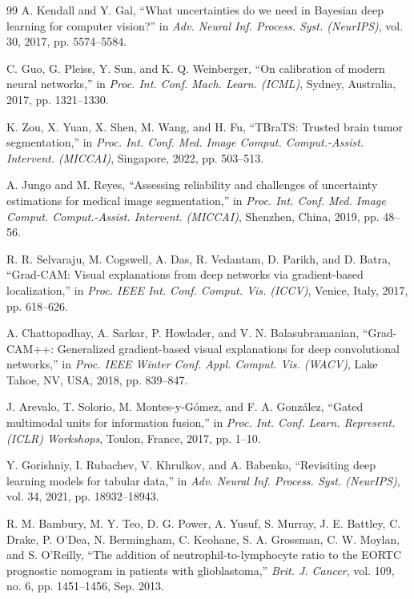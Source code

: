 \documentclass[conference]{IEEEtran}
\begin{document}
\begin{thebibliography}{99}
A. Kendall and Y. Gal, ``What uncertainties do we need in Bayesian deep learning for computer vision?'' in \textit{Adv. Neural Inf. Process. Syst. (NeurIPS)}, vol. 30, 2017, pp. 5574--5584.

C. Guo, G. Pleiss, Y. Sun, and K. Q. Weinberger, ``On calibration of modern neural networks,'' in \textit{Proc. Int. Conf. Mach. Learn. (ICML)}, Sydney, Australia, 2017, pp. 1321--1330.

K. Zou, X. Yuan, X. Shen, M. Wang, and H. Fu, ``TBraTS: Trusted brain tumor segmentation,'' in \textit{Proc. Int. Conf. Med. Image Comput. Comput.-Assist. Intervent. (MICCAI)}, Singapore, 2022, pp. 503--513.

A. Jungo and M. Reyes, ``Assessing reliability and challenges of uncertainty estimations for medical image segmentation,'' in \textit{Proc. Int. Conf. Med. Image Comput. Comput.-Assist. Intervent. (MICCAI)}, Shenzhen, China, 2019, pp. 48--56.

R. R. Selvaraju, M. Cogswell, A. Das, R. Vedantam, D. Parikh, and D. Batra, ``Grad-CAM: Visual explanations from deep networks via gradient-based localization,'' in \textit{Proc. IEEE Int. Conf. Comput. Vis. (ICCV)}, Venice, Italy, 2017, pp. 618--626.

A. Chattopadhay, A. Sarkar, P. Howlader, and V. N. Balasubramanian, ``Grad-CAM++: Generalized gradient-based visual explanations for deep convolutional networks,'' in \textit{Proc. IEEE Winter Conf. Appl. Comput. Vis. (WACV)}, Lake Tahoe, NV, USA, 2018, pp. 839--847.

J. Arevalo, T. Solorio, M. Montes-y-G\'{o}mez, and F. A. Gonz\'{a}lez, ``Gated multimodal units for information fusion,'' in \textit{Proc. Int. Conf. Learn. Represent. (ICLR) Workshops}, Toulon, France, 2017, pp. 1--10.

Y. Gorishniy, I. Rubachev, V. Khrulkov, and A. Babenko, ``Revisiting deep learning models for tabular data,'' in \textit{Adv. Neural Inf. Process. Syst. (NeurIPS)}, vol. 34, 2021, pp. 18932--18943.

R. M. Bambury, M. Y. Teo, D. G. Power, A. Yusuf, S. Murray, J. E. Battley, C. Drake, P. O'Dea, N. Bermingham, C. Keohane, S. A. Grossman, C. W. Moylan, and S. O'Reilly, ``The addition of neutrophil-to-lymphocyte ratio to the EORTC prognostic nomogram in patients with glioblastoma,'' \textit{Brit. J. Cancer}, vol. 109, no. 6, pp. 1451--1456, Sep. 2013.


\end{thebibliography}
\end{document}
